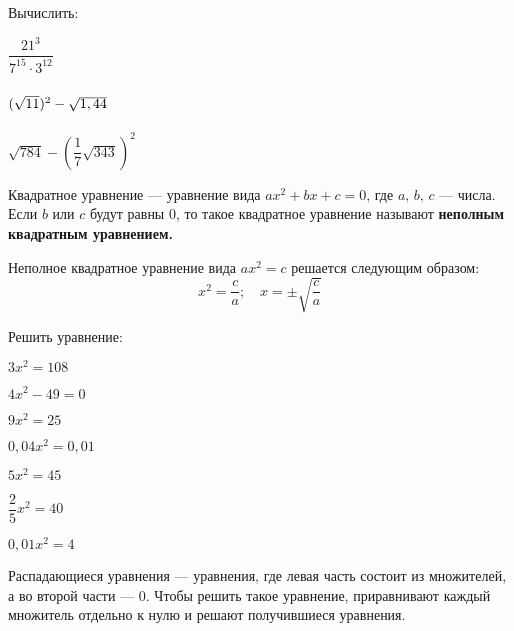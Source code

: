 %
%
\begin{class}[number=5]
	\begin{listofex}
		\item Вычислить:
		\begin{enumcols}[itemcolumns=3]
			\item \( \dfrac{21^3}{7^{15}\cdot3^{12}} \)
			\item \( \vphantom{\dfrac{1^1}{1^1}}(\sqrt{11})^2-\sqrt{1,44} \)
			\item \( \sqrt{784}-\left( \dfrac{1}{7}\sqrt{343} \right)^2 \)
		\end{enumcols}
	\end{listofex}
	\begin{definit}
		Квадратное уравнение --- уравнение вида \( ax^2+bx+c=0 \), где \( a,\, b,\, c \) --- числа. Если \( b \) или \( c \) будут равны 0, то такое квадратное уравнение называют \textbf{неполным квадратным уравнением.}
	\end{definit}
	\begin{definit}
		Неполное квадратное уравнение вида \( ax^2=c \) решается следующим образом:
		\[ x^2=\dfrac{c}{a};\quad x=\pm\sqrt{\dfrac{c}{a}} \]
	\end{definit}
	\begin{listofex}[resume]
		\item Решить уравнение:
		\begin{enumcols}[itemcolumns=4]
			\item \exercise{386}
			\item \exercise{387}
			\item \exercise{388}
			\item \exercise{390}
			\item \( 3x^2=108 \)
			\item \( 4x^2-49=0 \)
			\item \( 9x^2=25 \)
			\item \( 0,04x^2=0,01 \)
			\item \( 5x^2=45 \)
			\item \( \dfrac{2}{5}x^2=40 \)
			\item \( 0,01x^2=4 \)
		\end{enumcols}
	\end{listofex}
	\begin{definit}
		Распадающиеся уравнения --- уравнения, где левая часть состоит из множителей, а во второй части --- \( 0 \). Чтобы решить такое уравнение, приравнивают каждый множитель отдельно к нулю и решают получившиеся уравнения.

\end{definit}
\end{class}

